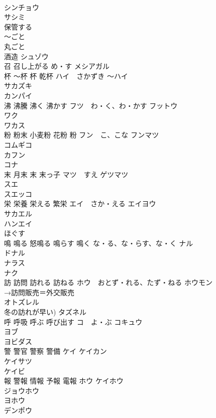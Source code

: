 \documentclass[8pt]{extreport}
\begin{document}
\begin{CJK}{UTF8}{min}
\\	シンチョウ 
\\	サシミ 
\\	保管する	
\\	〜ごと	
\\	丸ごと 
\\	酒造	シュゾウ 
\\	召 召し上がる	め・す メシアガル
\\	杯 〜杯 杯 乾杯	ハイ　さかずき 〜ハイ 
\\	サカズキ
\\	カンパイ
\\	沸 沸騰 沸く 沸かす	フツ　わ・く、わ・かす フットウ 
\\	ワク 
\\	ワカス 
\\	粉 粉末 小麦粉 花粉 粉	フン　こ、こな フンマツ 
\\	コムギコ 
\\	カフン 
\\	コナ 
\\	末 月末 末 末っ子	マツ　すえ ゲツマツ 
\\	スエ 
\\	スエッコ 
\\	栄 栄養 栄える 繁栄	エイ　さか・える エイヨウ 
\\	サカエル 
\\	ハンエイ 
\\	ほぐす	
\\	鳴 鳴る 怒鳴る 鳴らす 鳴く	な・る、な・らす、な・く ナル 
\\	ドナル 
\\	ナラス 
\\	ナク 
\\	訪 訪問 訪れる 訪ねる	ホウ　おとず・れる、たず・ねる ホウモン 
\\	→訪問販売＝外交販売 
\\	オトズレル 
\\	冬の訪れが早い) タズネル 
\\	呼 呼吸 呼ぶ 呼び出す	コ　よ・ぶ コキュウ 
\\	ヨブ 
\\	ヨビダス 
\\	警 警官 警察 警備	ケイ ケイカン 
\\	ケイサツ 
\\	ケイビ 
\\	報 警報 情報 予報 電報	ホウ ケイホウ 
\\	ジョウホウ 
\\	ヨホウ 
\\	デンポウ 

\end{CJK}
\end{document}
